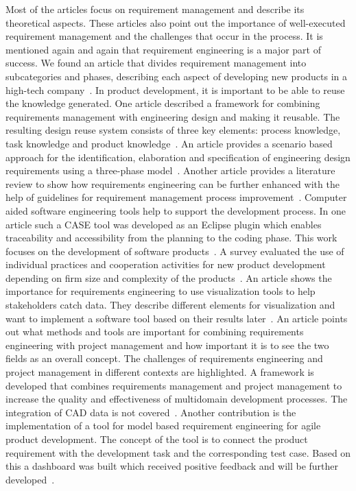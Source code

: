     Most of the articles focus on requirement management and describe its theoretical aspects. These articles also point out the importance of well-executed requirement management and the challenges that occur in the process. It is mentioned again and again that requirement engineering is a major part of success.
    We found an article that divides requirement management into subcategories and phases, describing each aspect of developing new products in a high-tech company~\cite{Ahti2005}.
    In product development, it is important to be able to reuse the knowledge generated. One article described a framework for combining requirements management with engineering design and making it reusable. The resulting design reuse system consists of three key elements: process knowledge, task knowledge and product knowledge~\cite{BAXTER2008585}.
    An article provides a scenario based approach for the identification, elaboration and specification of engineering design requirements using a three-phase model~\cite{liu2012scenario}.
    Another article provides a literature review to show how requirements engineering can be further enhanced with the help of guidelines for requirement management process improvement~\cite{Kauppinen2005}.
    Computer aided software engineering tools help to support the development process. In one article such a CASE tool was developed as an Eclipse plugin which enables traceability and accessibility from the planning to the coding phase. This work focuses on the development of software products~\cite{6976693}.
    A survey evaluated the use of individual practices and cooperation activities for new product development depending on firm size and complexity of the products~\cite{sanchez2003flexibility}.
    An article shows the importance for requirements engineering to use visualization tools to help stakeholders catch data. They describe different elements for visualization and want to implement a software tool based on their results later~\cite{RICHTER2020271}.
    An article points out what methods and tools are important for combining requirements engineering with project management and how important it is to see the two fields as an overall concept. The challenges of requirements engineering and project management in different contexts are highlighted. A framework is developed that combines requirements management and project management to increase the quality and effectiveness of multidomain development processes. The integration of CAD data is not covered~\cite{Jorma2014}.
    Another contribution is the implementation of a tool for model based requirement engineering for agile product development. The concept of the tool is to connect the product requirement with the development task and the corresponding test case. Based on this a dashboard was built which received positive feedback and will be further developed~\cite{WINDISCH2022550}.
